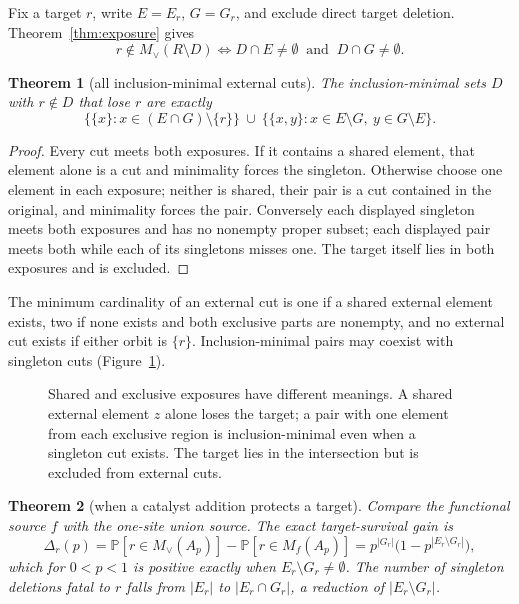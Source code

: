 \documentclass[11pt,a4paper]{article}
\theoremstyle{plain}
\newtheorem{theorem}{Theorem}[section]
\theoremstyle{definition}
\theoremstyle{remark}
\renewcommand{\Pr}{\mathbb{P}}
\begin{document}
Fix a target $r$, write $E=E_r$, $G=G_r$, and exclude direct target deletion. Theorem~\ref{thm:exposure} gives
\[
r\notin M_\vee(R\setminus D)\iff D\cap E\neq\emptyset\ \text{ and }\ D\cap G\neq\emptyset .
\]

\begin{theorem}[all inclusion-minimal external cuts]\label{thm:cuts}
The inclusion-minimal sets $D$ with $r\notin D$ that lose $r$ are exactly
\[
\big\{\{x\}:x\in(E\cap G)\setminus\{r\}\big\}\ \cup\ \big\{\{x,y\}:x\in E\setminus G,\ y\in G\setminus E\big\}.
\]
\end{theorem}

\begin{proof}
Every cut meets both exposures. If it contains a shared element, that element alone is a cut and minimality forces the singleton. Otherwise choose one element in each exposure; neither is shared, their pair is a cut contained in the original, and minimality forces the pair. Conversely each displayed singleton meets both exposures and has no nonempty proper subset; each displayed pair meets both while each of its singletons misses one. The target itself lies in both exposures and is excluded.
\end{proof}

The minimum cardinality of an external cut is one if a shared external element exists, two if none exists and both exclusive parts are nonempty, and no external cut exists if either orbit is $\{r\}$. Inclusion-minimal pairs may coexist with singleton cuts (Figure~\ref{fig:venn}).

\begin{figure}[t]
\centering
{}
\caption{Shared and exclusive exposures have different meanings. A shared external element $z$ alone loses the target; a pair with one element from each exclusive region is inclusion-minimal even when a singleton cut exists. The target lies in the intersection but is excluded from external cuts.}
\label{fig:venn}
\end{figure}

\begin{theorem}[when a catalyst addition protects a target]\label{thm:gain}
Compare the functional source $f$ with the one-site union source. The exact target-survival gain is
\[
\Delta_r(p)=\Pr[r\in M_\vee(A_p)]-\Pr[r\in M_f(A_p)]=p^{|G_r|}\big(1-p^{|E_r\setminus G_r|}\big),
\]
which for $0<p<1$ is positive exactly when $E_r\setminus G_r\neq\emptyset$. The number of singleton deletions fatal to $r$ falls from $|E_r|$ to $|E_r\cap G_r|$, a reduction of $|E_r\setminus G_r|$.
\end{theorem}
\end{document}
